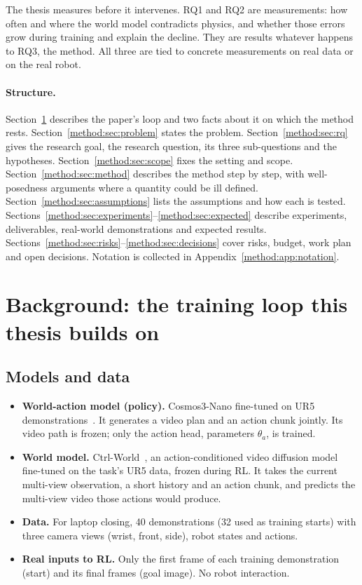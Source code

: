 The thesis measures before it intervenes. RQ1 and RQ2 are measurements: how often and where the world model contradicts physics, and whether those errors grow during training and explain the decline. They are results whatever happens to RQ3, the method. All three are tied to concrete measurements on real data or on the real robot.

\paragraph{Structure.} Section~\ref{method:sec:background} describes the paper's loop and two facts about it on which the method rests. Section~\ref{method:sec:problem} states the problem. Section~\ref{method:sec:rq} gives the research goal, the research question, its three sub-questions and the hypotheses. Section~\ref{method:sec:scope} fixes the setting and scope. Section~\ref{method:sec:method} describes the method step by step, with well-posedness arguments where a quantity could be ill defined. Section~\ref{method:sec:assumptions} lists the assumptions and how each is tested. Sections~\ref{method:sec:experiments}--\ref{method:sec:expected} describe experiments, deliverables, real-world demonstrations and expected results. Sections~\ref{method:sec:risks}--\ref{method:sec:decisions} cover risks, budget, work plan and open decisions. Notation is collected in Appendix~\ref{method:app:notation}.

\section{Background: the training loop this thesis builds on}\label{method:sec:background}

\subsection{Models and data}
\begin{itemize}
\item \textbf{World-action model (policy).} Cosmos3-Nano fine-tuned on UR5 demonstrations~\cite{cosmos3,a2a}. It generates a video plan and an action chunk jointly. Its video path is frozen; only the action head, parameters $\theta_a$, is trained.
\item \textbf{World model.} Ctrl-World~\cite{ctrlworld}, an action-conditioned video diffusion model fine-tuned on the task's UR5 data, frozen during RL. It takes the current multi-view observation, a short history and an action chunk, and predicts the multi-view video those actions would produce.
\item \textbf{Data.} For laptop closing, 40 demonstrations (32 used as training starts) with three camera views (wrist, front, side), robot states and actions.
\item \textbf{Real inputs to RL.} Only the first frame of each training demonstration (start) and its final frames (goal image). No robot interaction.
\end{itemize}

